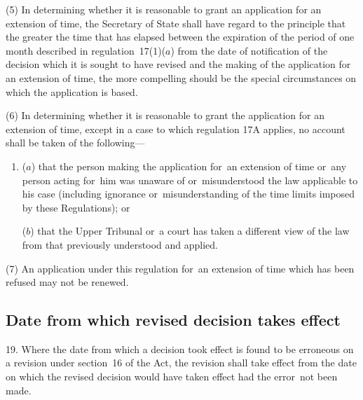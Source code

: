 \documentclass[a4paper,12pt]{article}
\begin{document}
(5) In determining whether it is reasonable to grant an application for an extension of time, the Secretary of State shall have regard to the principle that the greater the time that has elapsed between the expiration of the period of one month described in regulation~17(1)($a$) from the date of notification of the decision which it is sought to have revised and the making of the application for an extension of time, the more compelling should be the special circumstances on which the application is based.

(6) In determining whether it is reasonable to grant the application for an extension of time,
except in a case to which regulation 17A applies,  %
no account shall be taken of the following---
\begin{enumerate}\item[]
($a$) that the person making the application for~an extension of time or~any person acting for~him was unaware of or~misunderstood the law applicable to his case (including ignorance or~misunderstanding of the time limits imposed by these Regulations); or

($b$) that 
the Upper Tribunal  %
or~a court has taken a different view of the law from that previously understood and applied.
\end{enumerate}

(7) An application under this regulation for~an extension of time which has been refused may not be renewed.


\subsection[19. Date from which revised decision takes effect]{Date from which revised decision takes effect}

19.  Where the date from which a decision took effect is found to be erroneous on a revision under section~16 of the Act, the revision shall take effect from the date on which the revised decision would have taken effect had the error~not been made.
\end{document}
